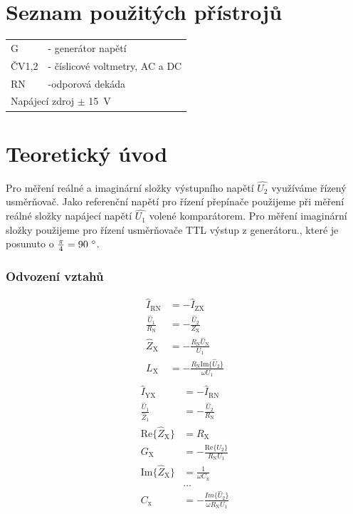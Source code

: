 \documentclass[a4paper,12pt]{article}   %
\begin{document}
\section{Seznam použitých přístrojů}
\label{chap:seznam_pristroju}
\begin{table}[h!]
  \centering
  \begin{tabular}{ll}
    G &- generátor napětí\\
    ČV1,2 &- číslicové voltmetry, AC a DC\\
    RN &-odporová dekáda\\\hline
    \multicolumn{2}{l}{Napájecí zdroj $\pm$ 15~V}\\
  \end{tabular}
\end{table}


\section{Teoretický úvod}
\label{chap:teoreticky_uvod}
Pro měření reálné a imaginární složky výstupního napětí $\hat{U_\text{2}}$ využíváme řízený usměrňovač. Jako referenční napětí pro řízení přepínače použijeme při měření reálné složky napájecí napětí $\hat{U_\text{1}}$ volené komparátorem. Pro měření imaginární složky použijeme pro řízení usměrňovače TTL výstup z generátoru., které je posunuto o $\frac{\pi}{4} = 90~\degree$. 

\subsubsection{Odvození vztahů}
\begin{equation}
  \begin{split}
    \hat{I}_\text{RN} &= -\hat{I}_\text{ZX}\\
    \frac{\hat{U}_\text{1}}{R_\text{N}} &= -\frac{\hat{U}_\text{2}}{Z_\text{X}}\\
    \hat{Z}_\text{X} &= -\frac{R_\text{N}\hat{U}_\text{N}}{U_\text{1}}\\
    L_\text{X} &= -\frac{R_\text{N}\text{Im}\{\hat{U}_\text{2}\}}{\omega U_\text{1}}\\
  \end{split}
\end{equation}
\begin{equation}
  \begin{split}
    \hat{I}_\text{YX} &= -\hat{I}_\text{RN}\\
    \frac{\hat{U}_\text{1}}{\hat{Z}_\text{1}} &= -\frac{\hat{U}_2}{R_\text{N}}\\
    \text{Re}\{\hat{Z}_\text{X}\} &= R_\text{X}\\
    G_\text{X} &= -\frac{\text{Re}\{U_2\}}{R_\text{N} U_\text{1}}\\
    \text{Im}\{\hat{Z}_\text{X}\} &= \frac{1}{\omega C_\text{x}}\\
    &\dots\\
    C_\text{x} &= -\frac{Im\{\hat{U}_\text{2}\}}{\omega R_\text{N}{U}_\text{1}}
  \end{split}
\end{equation}
\end{document}
